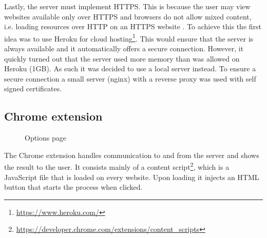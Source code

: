 Lastly, the server must implement HTTPS. This is because the user may view websites available only over HTTPS and browsers do not allow mixed content, i.e. loading resources over HTTP on an HTTPS website \cite{ChromeMixedContent}. To achieve this the first idea was to use Heroku for cloud hosting\footnote{\url{https://www.heroku.com/}}. This would ensure that the server is always available and it automatically offers a secure connection. However, it quickly turned out that the server used more memory than was allowed on Heroku (1GB). As such it was decided to use a local server instead. To ensure a secure connection a small server (nginx) with a reverse proxy was used with self signed certificates\cite{nginxReverseProxy}. 




\subsection{Chrome extension}
\begin{figure}
  \caption{Options page}
  \label{fig:options}
\end{figure}

The Chrome extension handles communication to and from the server and shows the result to the user. It consists mainly of a content script\footnote{\url{https://developer.chrome.com/extensions/content_scripts}}, which is a JavaScript file that is loaded on every website. Upon loading it injects an HTML button that starts the process when clicked. 

